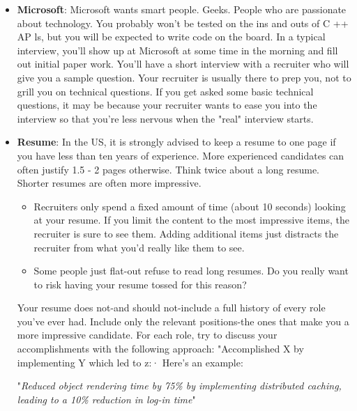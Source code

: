 \documentclass{report}
\begin{document}
\begin{itemize}
            \bigbreak \noindent 
            Delays can and do happen. Follow up with your recruiter if you expect a delay, but be respectful when you do. Recruiters are just like you. They get busy and forgetful too.
        \item \textbf{Microsoft}: Microsoft wants smart people. Geeks. People who are passionate about technology. You probably won't be tested on the ins and outs of C ++ AP ls, but you will be expected to write code on the board. 
            \bigbreak \noindent 
            In a typical interview, you'll show up at Microsoft at some time in the morning and fill out initial paper work. You'll have a short interview with a recruiter who will give you a sample question. Your recruiter is usually there to prep you, not to grill you on technical questions. If you get asked some basic technical questions, it may be because your recruiter wants to ease you into the interview so that you're less nervous when the "real" interview starts.
        \item \textbf{Resume}: In the US, it is strongly advised to keep a resume to one page if you have less than ten years of experience. More experienced candidates can often justify 1.5 - 2 pages otherwise.
            \bigbreak \noindent 
            Think twice about a long resume. Shorter resumes are often more impressive. 
            \begin{itemize}
                \item Recruiters only spend a fixed amount of time (about 10 seconds) looking at your resume. If you limit the content to the most impressive items, the recruiter is sure to see them. Adding additional items just distracts the recruiter from what you'd really like them to see.
                \item Some people just flat-out refuse to read long resumes. Do you really want to risk having your resume tossed for this reason? 
            \end{itemize}
            Your resume does not-and should not-include a full history of every role you've ever had. Include only the relevant positions-the ones that make you a more impressive candidate.
            \bigbreak \noindent 
            For each role, try to discuss your accomplishments with the following approach: "Accomplished X by implementing Y which led to z:· Here's an example:
            \begin{center}
                "\textit{Reduced object rendering time by 75\% by implementing distributed caching, leading to a 10\% reduction in log-in time}"

\end{center}
\end{itemize}
\end{document}
